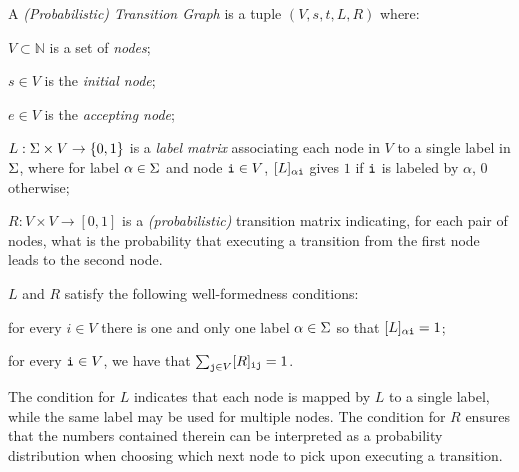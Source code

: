 \begin{definition} A \emph{(Probabilistic) Transition Graph} is a tuple $(V,s,t,L,R)$ where:
  \begin{inparaenum}[\itshape (i)]
    \item $V \subset \mathbb{N}$ is a set of \emph{nodes};
    \item $s\in V$ is the \emph{initial node};
    \item $e\in V$ is the \emph{accepting node};
    \item $L: \Sigma \times V \rightarrow \{0,1\}$ is a \emph{label matrix} associating each node in $V$ to a single label in $\Sigma$, where for label $\alpha \in \Sigma$ and node $\textnormal{\texttt{i}} \in V$, $[L]_{\alpha\textnormal{\texttt{i}}}$ gives $1$ if $\textnormal{\texttt{i}}$ is labeled by $\alpha$, $0$ otherwise;
    \item $R: V \times V \rightarrow [0,1]$ is a \emph{(probabilistic)} transition matrix indicating, for each pair of nodes, what is the probability that executing a transition from the first node leads to the second node.
  \end{inparaenum}
$L$ and $R$ satisfy the following well-formedness conditions:
\begin{inparaenum}[\itshape (i)]
\item for every $i \in V$ there is one and only one label $\alpha \in \Sigma$ so   that $[L]_{\alpha\textnormal{\texttt{i}}}=1$;
\item  for  every $\textnormal{\texttt{i}} \in V$, we have that $\sum_{\textnormal{\texttt{j}}\in V}[R]_{\textnormal{\texttt{ij}}}=1$.
\end{inparaenum}
\end{definition}
The condition for $L$ indicates that each node is mapped by $L$ to a single label, while the same label may be used for multiple nodes. The condition for $R$ ensures that the numbers contained therein can be interpreted as a probability distribution when choosing which next node to pick upon executing a transition.

